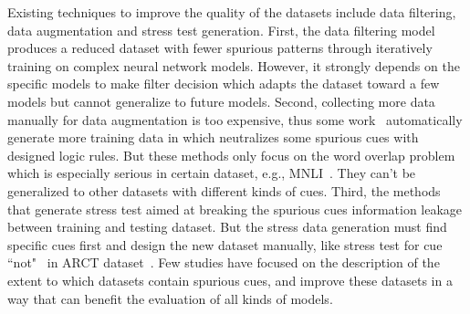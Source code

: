 Existing techniques to improve the quality of the datasets 
include data filtering, data augmentation and stress test generation. 
First, the data filtering model~\cite{bras2020adversarial} 
produces a reduced dataset with fewer spurious patterns through iteratively 
training on complex neural network models. However, it strongly 
depends on the specific models to make filter decision which 
adapts the dataset toward a few models but cannot generalize to future
models. 
Second, collecting more data manually for data augmentation
is too expensive, thus some work~\cite{wang2019if,mccoy2019right} automatically generate 
more training data in which neutralizes some 
spurious cues with designed logic rules. 
But these methods only focus on the word overlap problem 
which is especially serious in certain dataset, e.g., MNLI~\cite{wang2018glue}. 
They can't be generalized to other datasets with different kinds of
cues. Third, the methods~\cite{naik2018stress,mccoy2019right} 
that generate stress test aimed at breaking the spurious cues information leakage 
between training and testing dataset. 
But the stress data generation must find 
specific cues first and design the new dataset manually, 
like stress test for cue ``not"~\cite{schuster2019towards}
in ARCT dataset~\cite{niven2019probing}.
Few studies have focused on the description of the extent 
to which datasets contain spurious cues, and improve these datasets 
in a way that can benefit the evaluation of all kinds of models. 

